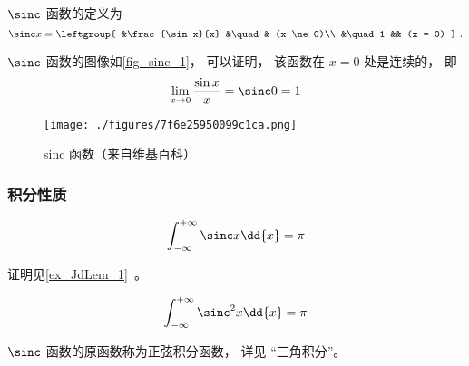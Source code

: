

$\sinc$ 函数的定义为
\begin{equation}
\sinc x = 
\leftgroup{
&\frac{\sin x}{x} &\quad & (x \ne 0)\\
&\quad 1 && (x = 0)
}~.\end{equation}

$\sinc$ 函数的图像如\autoref{fig_sinc_1}， 可以证明， 该函数在 $x=0$ 处是连续的， 即
\begin{equation}
\lim_{x \to 0}\frac{\sin x}{x} = \sinc 0 = 1
\end{equation}

\begin{figure}[ht]
\centering
\texttt{[image: ./figures/7f6e25950099c1ca.png]}
\caption{sinc 函数（来自维基百科）} \label{fig_sinc_1}
\end{figure}

\subsubsection{积分性质}
\begin{equation}\label{eq_sinc_2}
\int_{-\infty}^{+\infty} \sinc x \dd{x} = \pi
\end{equation}

证明见\autoref{ex_JdLem_1}~。

\begin{equation}\label{eq_sinc_1}
\int_{-\infty}^{+\infty} \sinc^2 x \dd{x} = \pi
\end{equation}

$\sinc$ 函数的原函数称为正弦积分函数， 详见 “三角积分”。
